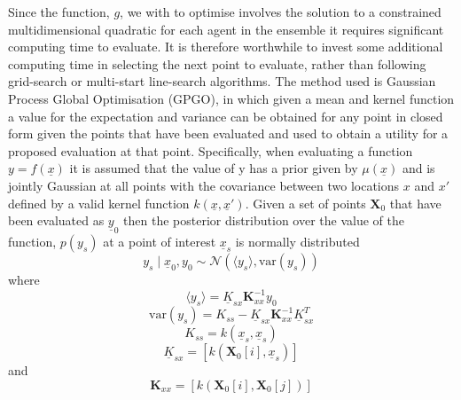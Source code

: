 \documentclass[a4paper, 10 pt, conference]{ieeeconf}  %
\begin{document}
Since the function, $g$, we with to optimise involves the solution to a constrained multidimensional quadratic for each agent in the ensemble it requires significant computing time to evaluate. It is therefore worthwhile to invest some additional computing time in selecting the next point to evaluate, rather than following grid-search or multi-start line-search algorithms. The method used is Gaussian Process Global Optimisation (GPGO)\cite{garnettgaussian}, in which given a mean and kernel function a value for the expectation and variance can be obtained for any point in closed form given the points that have been evaluated and used to obtain a utility for a proposed evaluation at that point.
Specifically, when evaluating a function $y=f(\underline{x})$  it is assumed that the value of y has a prior given by $\mu (\underline{x})$ and is jointly Gaussian at all points with the covariance between two locations $x$ and $x'$ defined by a valid kernel function $k(\underline{x},\underline{x}')$. Given a set of points $\mathbf{X}_{0}$ that have been evaluated as $\underline{y}_{0}$ then the posterior distribution over the value of the function, $p(y_{s})$ at a point of interest $\underline{x}_s$ is normally distributed
\begin{equation}
 y_{s}\mid \underline{x}_{0},y_{0}\sim\mathcal{N}\left( \langle y_{s}\rangle ,\mathrm{var}(y_{s})\right)
\end{equation}
where
\begin{equation}
\langle y_{s}\rangle 	=\underline{K}_{sx}\mathbf{K}_{xx}^{-1}y_{0}
\end{equation}
\begin{equation}
\mathrm{var}\left(y_{s}\right)	=K_{ss}-\underline{K}_{sx} \mathbf{K}_{xx}^{-1} \underline{K}_{sx}^{T}
\end{equation}
\begin{equation}
K_{ss}	= k(\underline{x}_s,\underline{x}_s)
\end{equation}
\begin{equation}
\underline{K}_{sx}	=[k\left(\mathbf{X}_{0}[i],\underline{x}_s\right)]
\end{equation}
and
\begin{equation}
\mathbf{K}_{xx}	=[k\left(\mathbf{X}_{0}[i],\mathbf{X}_{0}[j]\right)]
\end{equation}
\end{document}
